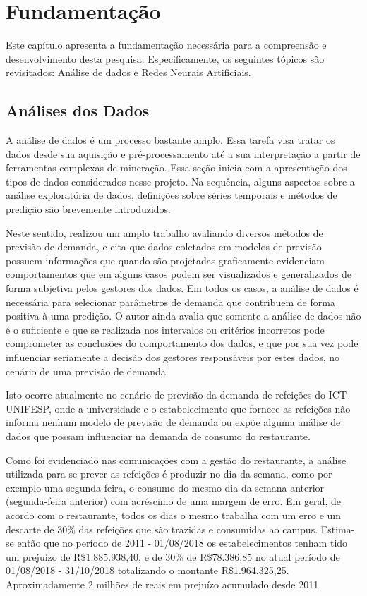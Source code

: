   \chapter{Fundamentação} \label{cap:teoria}
  
Este capítulo apresenta a fundamentação necessária para a compreensão e desenvolvimento desta pesquisa. Especificamente, os seguintes tópicos são revisitados: 
Análise de dados e Redes Neurais Artificiais.
 
\section{Análises dos Dados}

A análise de dados é um processo bastante amplo. Essa tarefa visa tratar os dados desde sua aquisição e pré-processamento até a sua interpretação a partir de ferramentas complexas de mineração. Essa seção inicia com a apresentação dos tipos de dados considerados nesse projeto. Na sequência, alguns aspectos sobre a análise exploratória de dados, definições sobre séries temporais e métodos de predição são brevemente introduzidos.

Neste sentido,  realizou um amplo trabalho avaliando  diversos métodos de previsão de demanda, e cita que dados coletados em modelos de previsão possuem informações que quando são projetadas graficamente evidenciam comportamentos que em alguns casos podem ser visualizados e generalizados de forma subjetiva pelos gestores dos dados. Em todos os casos, a análise de dados é necessária para selecionar parâmetros de demanda que contribuem de forma positiva à uma predição. O autor ainda avalia que somente a análise de dados não é o suficiente e que se realizada nos intervalos ou critérios incorretos pode comprometer as conclusões do comportamento dos dados, e que por sua vez pode influenciar seriamente a decisão dos gestores responsáveis por estes dados, no cenário de uma previsão de demanda.

Isto ocorre atualmente no cenário de previsão da demanda de refeições do ICT-UNIFESP, onde a universidade e o estabelecimento que fornece as refeições não informa nenhum modelo de previsão de demanda ou expõe alguma análise de dados que possam influenciar na demanda de consumo do restaurante. 

Como foi evidenciado nas comunicações com a gestão do restaurante, a análise utilizada para se prever as refeições é produzir no dia da semana, como por exemplo uma segunda-feira, o consumo do mesmo dia da semana anterior (segunda-feira anterior) com acréscimo de uma margem de erro. Em geral, de acordo com o restaurante, todos os dias o mesmo trabalha com um erro e um descarte de 30\% das refeições que são trazidas e consumidas ao campus. Estima-se então que no período de 2011 - 01/08/2018 os estabelecimentos tenham tido um prejuízo de R\$1.885.938,40, e de 30\% de R\$78.386,85 no atual período de 01/08/2018 - 31/10/2018 totalizando o montante  R\$1.964.325,25. Aproximadamente 2 milhões de reais em prejuízo acumulado desde 2011.


